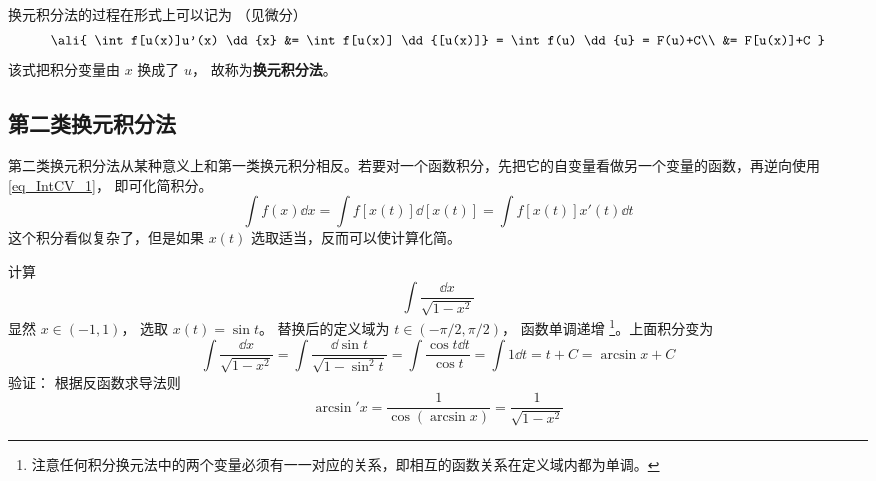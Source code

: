 换元积分法的过程在形式上可以记为 （见微分）
\begin{equation}\label{eq_IntCV_1}
\ali{
\int f[u(x)]u'(x) \dd{x} &= \int f[u(x)] \dd{[u(x)]} = \int f(u) \dd{u} = F(u)+C\\
&= F[u(x)]+C
}\end{equation}
该式把积分变量由 $x$ 换成了 $u$， 故称为\textbf{换元积分法}。

\subsection{第二类换元积分法}
第二类换元积分法从某种意义上和第一类换元积分相反。若要对一个函数积分，先把它的自变量看做另一个变量的函数，再逆向使用\autoref{eq_IntCV_1}， 即可化简积分。
\begin{equation}\label{eq_IntCV_6}
\int f(x) \dd{x} = \int f[x(t)] \dd{[x(t)]} = \int f[x(t)]x'(t) \dd{t}
\end{equation}
这个积分看似复杂了，但是如果 $x(t)$ 选取适当，反而可以使计算化简。

\begin{example}{}
计算
\begin{equation}
\int \frac{\dd{x}}{\sqrt{1-x^2}}
\end{equation}
显然 $x \in ( - 1,1)$， 选取 $x(t)=\sin t$。 替换后的定义域为 $t \in ( -\pi/2,\pi/2)$， 函数单调递增 \footnote{注意任何积分换元法中的两个变量必须有一一对应的关系，即相互的函数关系在定义域内都为单调。}。上面积分变为
\begin{equation}
\int \frac{\dd{x}}{\sqrt{1-x^2}}  = \int \frac{\dd{\sin t}}{\sqrt{1-\sin^2 t}} = \int \frac{\cos t\dd{t}}{\cos t}  = \int 1\dd{t}  = t + C = \arcsin x + C
\end{equation}
验证： 根据反函数求导法则
\begin{equation}
\arcsin'x = \frac{1}{\cos(\arcsin x)} = \frac{1}{\sqrt {1 - {x^2}} }
\end{equation}
\end{example}




